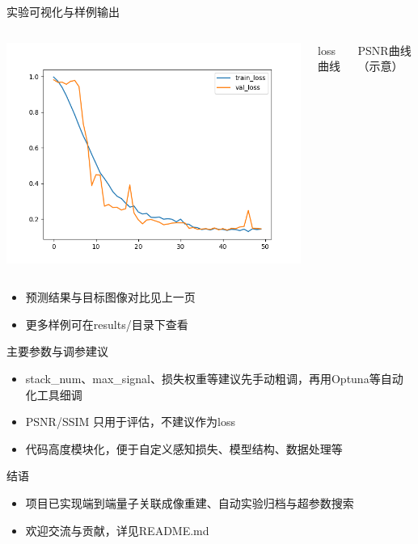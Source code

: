 \documentclass{beamer}
\begin{document}
\begin{frame}{实验可视化与样例输出}
\begin{columns}
\includegraphics[width=0.95\linewidth]{results/losses.png}
\centerline{\small loss曲线}
\centerline{\small PSNR曲线（示意）}
\end{columns}
\vspace{0.5em}
\begin{itemize}
    \item 预测结果与目标图像对比见上一页
    \item 更多样例可在results/目录下查看
\end{itemize}
\end{frame}

\begin{frame}{主要参数与调参建议}
\begin{itemize}
    \item stack\_num、max\_signal、损失权重等建议先手动粗调，再用Optuna等自动化工具细调
    \item PSNR/SSIM 只用于评估，不建议作为loss
    \item 代码高度模块化，便于自定义感知损失、模型结构、数据处理等
\end{itemize}
\end{frame}

\begin{frame}{结语}
\begin{itemize}
    \item 项目已实现端到端量子关联成像重建、自动实验归档与超参数搜索
    \item 欢迎交流与贡献，详见README.md
\end{itemize}
\end{frame}
\end{document}
